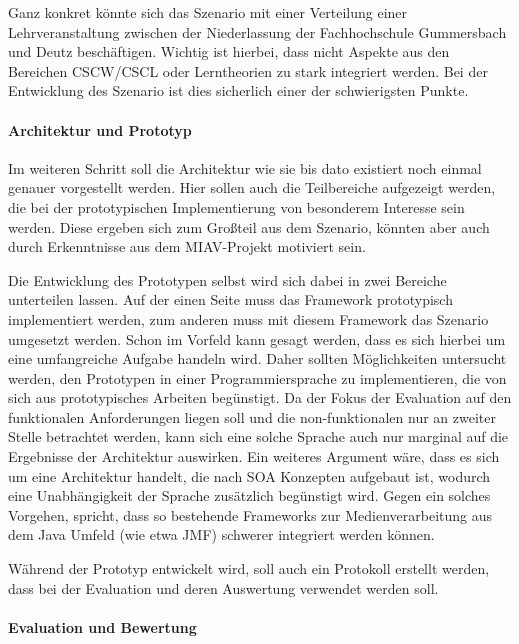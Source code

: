 \documentclass[11pt,headsepline,a4paper,bibtotoc,liststotoc,DIV12,BCOR12mm]{scrartcl}
\begin{document}
  Ganz konkret könnte sich das Szenario mit einer Verteilung einer Lehrveranstaltung zwischen der Niederlassung der Fachhochschule Gummersbach und Deutz beschäftigen. Wichtig ist hierbei, dass nicht Aspekte aus den Bereichen CSCW/CSCL oder Lerntheorien zu stark integriert werden. Bei der Entwicklung des Szenario ist dies sicherlich einer der schwierigsten Punkte.


\paragraph{Architektur und Prototyp} %
\label{par:architektur_und_prototyp}

  Im weiteren Schritt soll die Architektur wie sie bis dato existiert noch einmal genauer vorgestellt werden. Hier sollen auch die Teilbereiche aufgezeigt werden, die bei der prototypischen Implementierung von besonderem Interesse sein werden. Diese ergeben sich zum Großteil aus dem Szenario, könnten aber auch durch Erkenntnisse aus dem MIAV-Projekt motiviert sein.
  
  Die Entwicklung des Prototypen selbst wird sich dabei in zwei Bereiche unterteilen lassen. Auf der einen Seite muss das Framework prototypisch implementiert werden, zum anderen muss mit diesem Framework das Szenario umgesetzt werden. Schon im Vorfeld kann gesagt werden, dass es sich hierbei um eine umfangreiche Aufgabe handeln wird. Daher sollten Möglichkeiten untersucht werden, den Prototypen in einer Programmiersprache zu implementieren, die von sich aus prototypisches Arbeiten begünstigt. Da der Fokus der Evaluation auf den funktionalen Anforderungen liegen soll und die non-funktionalen nur an zweiter Stelle betrachtet werden, kann sich eine solche Sprache auch nur marginal auf die Ergebnisse der Architektur auswirken. Ein weiteres Argument wäre, dass es sich um eine Architektur handelt, die nach SOA Konzepten aufgebaut ist, wodurch eine Unabhängigkeit der Sprache zusätzlich begünstigt wird. Gegen ein solches Vorgehen, spricht, dass so bestehende Frameworks zur Medienverarbeitung aus dem Java Umfeld (wie etwa JMF) schwerer integriert werden können.
  
  Während der Prototyp entwickelt wird, soll auch ein Protokoll erstellt werden, dass bei der Evaluation und deren Auswertung verwendet werden soll.
  

\paragraph{Evaluation und Bewertung} %
\label{par:evaluation_und_bewertung}
\end{document}
